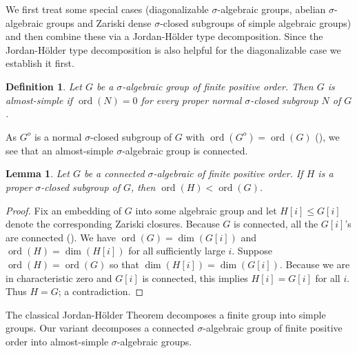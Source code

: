 \documentclass[oneside,reqno]{amsart}
\newtheorem{lemma}[theo]{Lemma}
\newtheorem{defi}[theo]{Definition}
\theoremstyle{definition}
\newcommand{\ord}{\operatorname{ord}}
\newcommand{\s}{\sigma}
\begin{document}
We first treat some special cases (diagonalizable $\s$-algebraic groups, abelian $\s$-algebraic groups and Zariski dense $\s$-closed subgroups of simple algebraic groups) and then combine these via a Jordan-H\"{o}lder type decomposition. Since the Jordan-H\"{o}lder type decomposition is also helpful for the diagonalizable case we establish it first.



\begin{defi} \label{defi: almost-simple sdim zero}
	Let $G$ be a $\s$-algebraic group of finite positive order. Then $G$ is \emph{almost-simple} if $\ord(N)=0$ for every proper normal $\s$-closed subgroup $N$ of $G$. 
\end{defi}

As $G^o$ is a normal $\s$-closed subgroup of $G$ with $\ord(G^o)=\ord(G)$ (\cite[Cor. 6.13]{Wibmer:almostsimple}), we see that an almost-simple $\s$-algebraic group is connected. 


\begin{lemma} \label{lemma: order drops}
	Let $G$ be a connected $\s$-algebraic of finite positive order. If $H$ is a proper $\s$-closed subgroup of $G$, then $\ord(H)<\ord(G)$.
\end{lemma}
\begin{proof}
Fix an embedding of $G$ into some algebraic group and let $H[i]\leq G[i]$ denote the corresponding Zariski closures. Because $G$ is connected, all the $G[i]$'s are connected (\cite[Lemma~6.12]{Wibmer:almostsimple}). We have $\ord(G)=\dim(G[i])$ and $\ord(H)=\dim(H[i])$ for all sufficiently large $i$. Suppose $\ord(H)=\ord(G)$ so that $\dim(H[i])=\dim(G[i])$. Because we are in characteristic zero and $G[i]$ is connected, this implies $H[i]=G[i]$ for all $i$. Thus $H=G$; a contradiction.
\end{proof}	



The classical Jordan-H\"{o}lder Theorem decomposes a finite group into simple groups. Our variant decomposes a connected $\s$-algebraic group of finite positive order into almost-simple $\s$-algebraic groups. 
\end{document}
